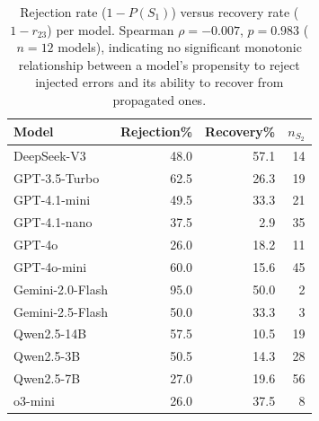 \begin{table}[t]
\centering
\caption{Rejection rate ($1 - P(S_1)$) versus recovery rate ($1 - r_{23}$) per model. Spearman $\rho = -0.007$, $p = 0.983$ ($n = 12$ models), indicating no significant monotonic relationship between a model's propensity to reject injected errors and its ability to recover from propagated ones.}
\label{tab:rejection_recovery}
\begin{tabular}{l r r r}
\toprule
Model & Rejection\% & Recovery\% & $n_{S_2}$ \\
\midrule
DeepSeek-V3 & 48.0 & 57.1 & 14 \\
GPT-3.5-Turbo & 62.5 & 26.3 & 19 \\
GPT-4.1-mini & 49.5 & 33.3 & 21 \\
GPT-4.1-nano & 37.5 & 2.9 & 35 \\
GPT-4o & 26.0 & 18.2 & 11 \\
GPT-4o-mini & 60.0 & 15.6 & 45 \\
Gemini-2.0-Flash & 95.0 & 50.0 & 2 \\
Gemini-2.5-Flash & 50.0 & 33.3 & 3 \\
Qwen2.5-14B & 57.5 & 10.5 & 19 \\
Qwen2.5-3B & 50.5 & 14.3 & 28 \\
Qwen2.5-7B & 27.0 & 19.6 & 56 \\
o3-mini & 26.0 & 37.5 & 8 \\
\bottomrule
\end{tabular}
\end{table}